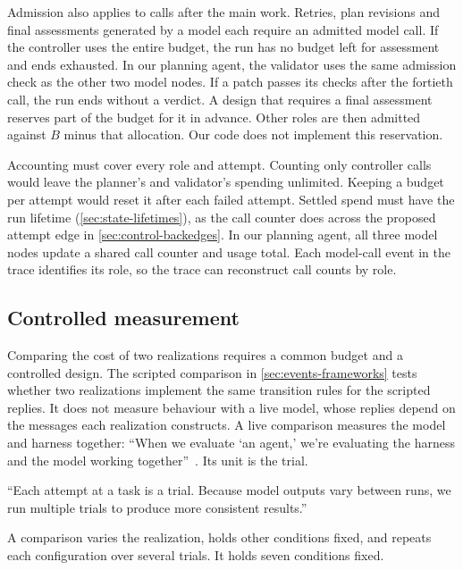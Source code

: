 Admission also applies to calls after the main work. Retries, plan revisions and final assessments
generated by a model each require an admitted model call. If the controller uses the entire
budget, the run has no budget left for assessment and ends exhausted. In our planning agent, the
validator uses the same admission check as the other two model nodes. If a patch passes its checks
after the fortieth call, the run ends  without a verdict. A design that
requires a final assessment reserves part of the budget for it in advance. Other roles are then
admitted against $B$ minus that allocation. Our code does not implement this reservation.

Accounting must cover every role and attempt. Counting only controller calls would leave the
planner's and validator's spending unlimited. Keeping a budget per attempt would reset it after
each failed attempt. Settled spend must have the run lifetime (\cref{sec:state-lifetimes}), as the
call counter does across the proposed attempt edge in \cref{sec:control-backedges}. In our
planning agent, all three model nodes update a shared call counter and usage total. Each model-call
event in the trace identifies its role, so the trace can reconstruct call counts by role.

\subsection{Controlled measurement}
\label{sec:budgets-measurement}

Comparing the cost of two realizations requires a common budget and a controlled design. The
scripted comparison in \cref{sec:events-frameworks} tests whether two realizations implement the
same transition rules for the scripted replies. It does not measure behaviour with a live model, whose replies depend
on the messages each realization constructs. A live comparison measures the model and harness
together: ``When we evaluate `an agent,' we're evaluating the harness and the model working
together''~\citep{anthropic-evals-agents}. Its unit is the trial.

\begin{definition}[Trial]
\label{def:trial}
``Each attempt at a task is a trial. Because model outputs vary between runs, we run multiple trials
to produce more consistent results.''
\end{definition}

A comparison varies the realization, holds other conditions fixed, and repeats each configuration
over several trials. It holds seven conditions fixed.

